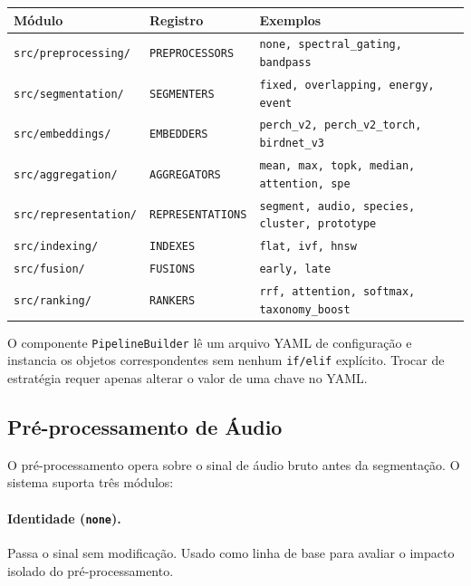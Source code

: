 \documentclass[12pt,a4paper]{article}
\begin{document}
\begin{center}
\begin{tabular}{lll}
\toprule
\textbf{Módulo} & \textbf{Registro} & \textbf{Exemplos} \\
\midrule
\texttt{src/preprocessing/} & \texttt{PREPROCESSORS}  & \texttt{none, spectral\_gating, bandpass} \\
\texttt{src/segmentation/}  & \texttt{SEGMENTERS}     & \texttt{fixed, overlapping, energy, event} \\
\texttt{src/embeddings/}    & \texttt{EMBEDDERS}      & \texttt{perch\_v2, perch\_v2\_torch, birdnet\_v3} \\
\texttt{src/aggregation/}   & \texttt{AGGREGATORS}    & \texttt{mean, max, topk, median, attention, spe} \\
\texttt{src/representation/}& \texttt{REPRESENTATIONS}& \texttt{segment, audio, species, cluster, prototype} \\
\texttt{src/indexing/}      & \texttt{INDEXES}        & \texttt{flat, ivf, hnsw} \\
\texttt{src/fusion/}        & \texttt{FUSIONS}        & \texttt{early, late} \\
\texttt{src/ranking/}       & \texttt{RANKERS}        & \texttt{rrf, attention, softmax, taxonomy\_boost} \\
\bottomrule
\end{tabular}
\end{center}

O componente \texttt{PipelineBuilder} lê um arquivo YAML de configuração e
instancia os objetos correspondentes sem nenhum \texttt{if/elif} explícito.
Trocar de estratégia requer apenas alterar o valor de uma chave no YAML.

\subsection{Pré-processamento de Áudio}

O pré-processamento opera sobre o sinal de áudio bruto antes da segmentação.
O sistema suporta três módulos:

\paragraph{Identidade (\texttt{none}).} Passa o sinal sem modificação. Usado
como linha de base para avaliar o impacto isolado do pré-processamento.
\end{document}
